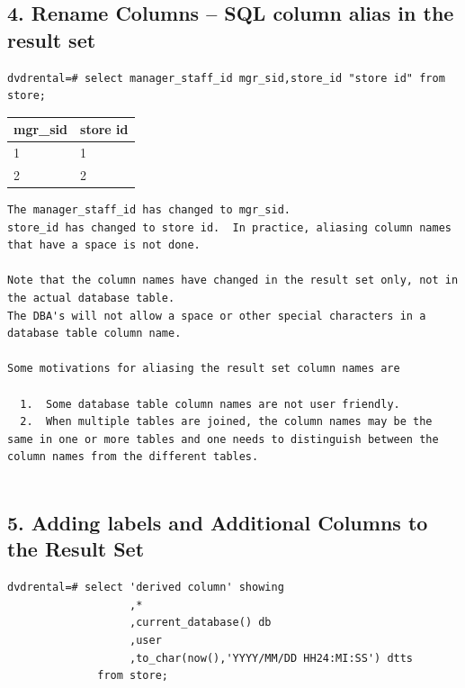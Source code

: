 \documentclass[]{book}
\theoremstyle{definition}
\theoremstyle{definition}
\theoremstyle{definition}
\theoremstyle{remark}
\begin{document}
\hypertarget{rename-columns-sql-column-alias-in-the-result-set}{%
\subsection{4. Rename Columns -- SQL column alias in the result
set}\label{rename-columns-sql-column-alias-in-the-result-set}}

\begin{verbatim}
dvdrental=# select manager_staff_id mgr_sid,store_id "store id" from store;  
\end{verbatim}

\begin{longtable}[]{@{}ll@{}}
\toprule
mgr\_sid & store id\tabularnewline
\midrule
\endhead
1 & 1\tabularnewline
2 & 2\tabularnewline
\bottomrule
\end{longtable}

\begin{verbatim}
The manager_staff_id has changed to mgr_sid.
store_id has changed to store id.  In practice, aliasing column names that have a space is not done.

Note that the column names have changed in the result set only, not in the actual database table.  
The DBA's will not allow a space or other special characters in a database table column name.  

Some motivations for aliasing the result set column names are

  1.  Some database table column names are not user friendly.
  2.  When multiple tables are joined, the column names may be the same in one or more tables and one needs to distinguish between the column names from the different tables.
  
\end{verbatim}

\hypertarget{adding-labels-and-additional-columns-to-the-result-set}{%
\subsection{5. Adding labels and Additional Columns to the Result
Set}\label{adding-labels-and-additional-columns-to-the-result-set}}

\begin{verbatim}
dvdrental=# select 'derived column' showing
                   ,*
                   ,current_database() db
                   ,user
                   ,to_char(now(),'YYYY/MM/DD HH24:MI:SS') dtts 
              from store; 
\end{verbatim}
\end{document}
